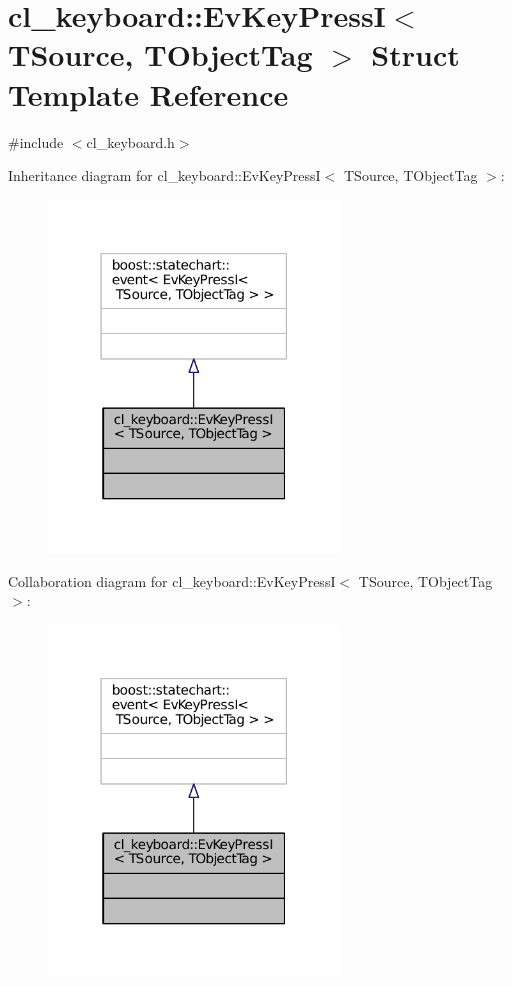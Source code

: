 \hypertarget{structcl__keyboard_1_1EvKeyPressI}{}\section{cl\+\_\+keyboard\+:\+:Ev\+Key\+PressI$<$ T\+Source, T\+Object\+Tag $>$ Struct Template Reference}
\label{structcl__keyboard_1_1EvKeyPressI}


{\ttfamily \#include $<$cl\+\_\+keyboard.\+h$>$}



Inheritance diagram for cl\+\_\+keyboard\+:\+:Ev\+Key\+PressI$<$ T\+Source, T\+Object\+Tag $>$\+:
\nopagebreak
\begin{figure}[H]
\begin{center}
\leavevmode
\includegraphics[width=219pt]{structcl__keyboard_1_1EvKeyPressI__inherit__graph}
\end{center}
\end{figure}


Collaboration diagram for cl\+\_\+keyboard\+:\+:Ev\+Key\+PressI$<$ T\+Source, T\+Object\+Tag $>$\+:
\nopagebreak
\begin{figure}[H]
\begin{center}
\leavevmode
\includegraphics[width=219pt]{structcl__keyboard_1_1EvKeyPressI__coll__graph}
\end{center}
\end{figure}


